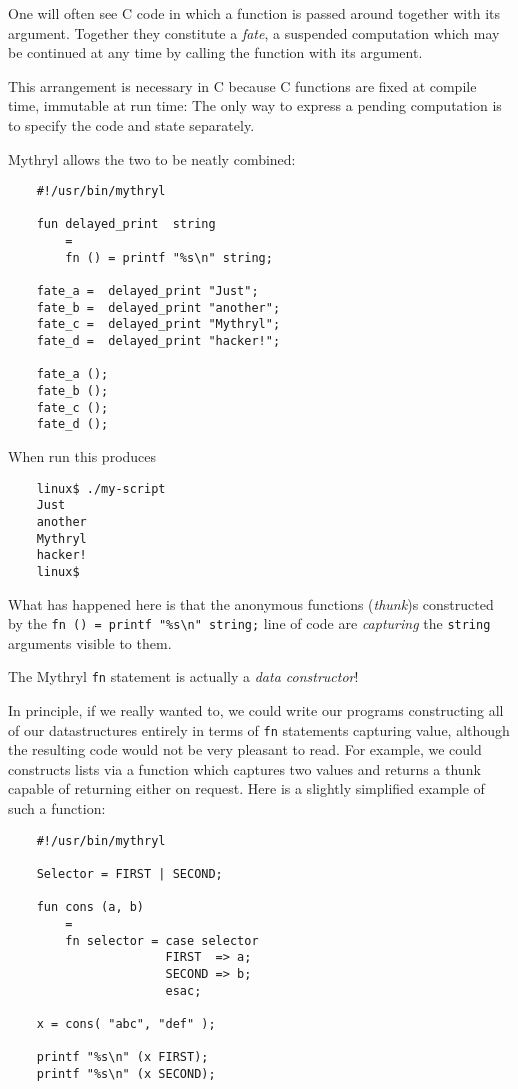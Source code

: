 One will often see C code in which a function is passed around 
together with its argument.  Together they constitute a {\it 
fate}, a suspended computation which may be continued 
at any time by calling the function with its argument.

This arrangement is necessary in C because C functions are fixed 
at compile time, immutable at run time:  The only way to express 
a pending computation is to specify the code and state separately.

Mythryl allows the two to be neatly combined:

\begin{verbatim}
    #!/usr/bin/mythryl

    fun delayed_print  string
        =
        fn () = printf "%s\n" string;

    fate_a =  delayed_print "Just";
    fate_b =  delayed_print "another";
    fate_c =  delayed_print "Mythryl";
    fate_d =  delayed_print "hacker!";

    fate_a ();
    fate_b ();
    fate_c ();
    fate_d ();
\end{verbatim}

When run this produces

\begin{verbatim}
    linux$ ./my-script
    Just
    another
    Mythryl
    hacker!
    linux$ 
\end{verbatim}

What has happened here is that the anonymous functions ({\it thunk})s constructed 
by the {\tt \verb|fn () = printf "%s\n" string;|} line of code are {\it capturing} the 
{\tt string} arguments visible to them.

The Mythryl {\tt fn} statement is actually a {\it data constructor}!

In principle, if we really wanted to, we could write our programs 
constructing all of our datastructures entirely in terms of {\tt fn} 
statements capturing value, although the resulting code would not be 
very pleasant to read.  For example, we could constructs lists via 
a function which captures two values and returns a thunk capable of 
returning either on request.  Here is a slightly simplified example 
of such a function:

\begin{verbatim}
    #!/usr/bin/mythryl

    Selector = FIRST | SECOND;

    fun cons (a, b)
        =
        fn selector = case selector
                      FIRST  => a;
                      SECOND => b;
                      esac;

    x = cons( "abc", "def" );

    printf "%s\n" (x FIRST);
    printf "%s\n" (x SECOND);
\end{verbatim}


